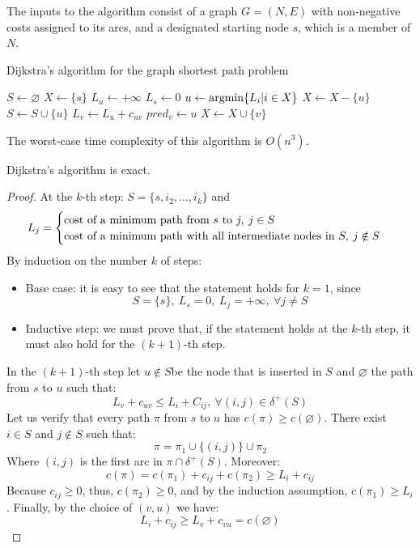 The inputs to the algorithm consist of a graph $G=(N, E)$ with non-negative costs assigned to its arcs, and a designated starting node $s$, which is a member of $N$.
\begin{algorithm}[H]
    \caption{Dijkstra's algorithm for the graph shortest path problem}
        \begin{algorithmic}[1]
            \State $S \leftarrow \varnothing$
            \State $X \leftarrow \{s\}$
                \State $L_u \leftarrow +\infty$
            \EndFor
            \State $L_s \leftarrow 0$
                \State $u \leftarrow \textnormal{argmin}\{L_i|i \in X\}$
                \State $X \leftarrow X-\{u\}$
                \State $S \leftarrow S \cup \{u\}$
                    \State $L_v \leftarrow L_u+c_{uv}$
                    \State $pred_v \leftarrow u$
                    \State $X \leftarrow X \cup \{v\}$
                \EndFor
            \EndWhile
        \end{algorithmic}
\end{algorithm}
The worst-case time complexity of this algorithm is $O(n^3)$. 
\begin{proposition}
    Dijkstra's algorithm is exact. 
\end{proposition}
\begin{proof}
    At the $k$-th step: $S = \{s,i_2,\dots,i_k\}$ and 
    \[L_j=
    \begin{cases}
        \textnormal{cost of a minimum path from } s \textnormal{ to } j,\:j \in S \\ 
        \textnormal{cost of a minimum path with all intermediate nodes in } S, \: j \notin S
    \end{cases}
    \]
    By induction on the number $k$ of steps: 
    \begin{itemize}
        \item Base case: it is easy to see that the statement holds for $k = 1$, since 
            \[S=\{s\},\: L_s=0,\: L_j= +\infty,\: \forall j \neq S \]
        \item Inductive step: we must prove that, if the statement holds at the $k$-th step, it must also hold for the $(k + 1)$-th step. 
    \end{itemize}
    In the $(k + 1)$-th step let $u \notin S$be the node that is inserted in $S$ and $\varnothing$ the path from $s$ to $u$ such that:
    \[L_v + c_{uv} \leq L_i + C_{ij},\: \forall(i,j) \in \delta^{+}(S)\]
    Let us verify that every path $\pi$ from $s$ to $u$ has $c(\pi) \geq c(\varnothing)$. There exist $i \in S$ and $j \notin S$ such that: 
    \[\pi= \pi_1 \cup \{(i,j)\} \cup \pi_2\]
    Where $(i, j)$ is the first arc in $\pi \cap \delta^{+}(S)$. Moreover: 
    \[c(\pi) = c(\pi_1) + c_{ij} + c(\pi_2) \geq L_i + c_{ij}\]
    Because $c_{ij} \geq 0$, thus, $c(\pi_2) \geq 0$, and by the induction assumption, $c(\pi_1) \geq L_i$. Finally, by the choice of $(v,u)$ we have: 
    \[L_i + c_{ij} \geq L_v + c_{vu} = c(\varnothing)\]
\end{proof}
